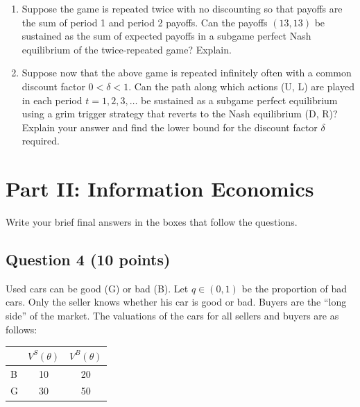 \documentclass[12pt,a4paper]{article}
\begin{document}
\begin{enumerate}
  \item Suppose the game is repeated twice with no discounting so that payoffs are the sum of period 1 and period 2 payoffs. Can the payoffs \((13, 13)\) be sustained as the sum of expected payoffs in a subgame perfect Nash equilibrium of the twice-repeated game? Explain.
  \item Suppose now that the above game is repeated infinitely often with a common discount factor \(0 < \delta < 1\). Can the path along which actions (U, L) are played in each period \(t=1,2,3,\dots\) be sustained as a subgame perfect equilibrium using a grim trigger strategy that reverts to the Nash equilibrium (D, R)? Explain your answer and find the lower bound for the discount factor \(\delta\) required.
\end{enumerate}


\section*{Part II: Information Economics}

Write your brief final answers in the boxes that follow the questions.

\subsection*{Question 4 (10 points)}

Used cars can be good (G) or bad (B). Let \(q \in (0,1)\) be the proportion of bad cars. Only the seller knows whether his car is good or bad. Buyers are the ``long side'' of the market. The valuations of the cars for all sellers and buyers are as follows:

\begin{table}[h!]
  \centering
  \renewcommand{\arraystretch}{1.1}
  \begin{tabular}{lcc}
    \toprule
    & \(V^S(\theta)\) & \(V^B(\theta)\) \\
    \midrule
    B & 10 & 20 \\
    G & 30 & 50 \\
    \bottomrule
  \end{tabular}
\end{table}
\end{document}
